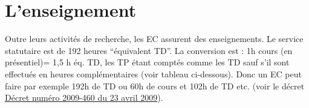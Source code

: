 % 
% 
% 
% 
% 




\section{L'enseignement}
\label{enseignement}

Outre leurs activit\'es de recherche, les EC assurent des enseignements. Le service statutaire est de 192 heures ``\'equivalent TD''. 
La conversion est : 1h cours (en pr\'esentiel)= 1,5 h \'eq. TD, les TP étant compt\'es comme les TD sauf s'il sont effectu\'es en heures compl\'ementaires (voir tableau ci-dessous). Donc un EC peut faire par exemple 192h de TD ou 60h de cours et 102h de TD etc. 
(voir le d\'ecret \href{http://www.legifrance.gouv.fr/affichTexte.do?cidTexte=JORFTEXT000020552216&dateTexte=&categorieLien=id}{D\'ecret num\'ero 2009-460 du 23 avril 2009}).


